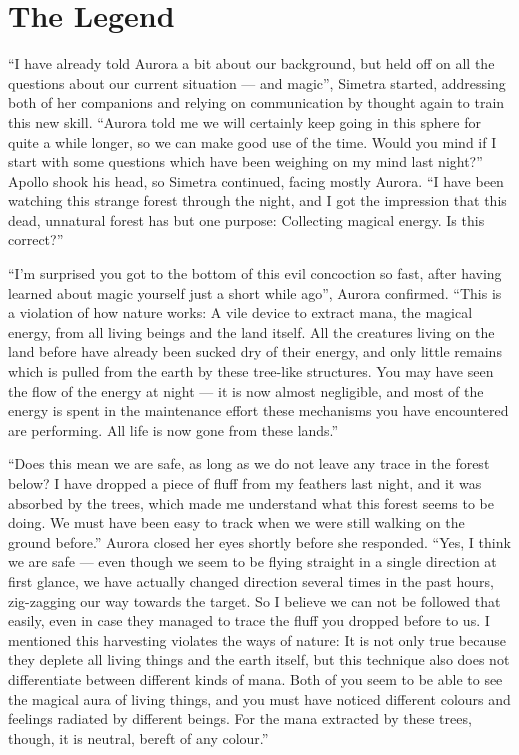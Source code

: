 \chapter{The Legend}
\label{cha:the-legend}
\enquote{I have already told Aurora a bit about our background, but held off on all the questions about our current situation --- and magic}, Simetra started, addressing both of her companions and relying on communication by thought again to train this new skill. \enquote{Aurora told me we will certainly keep going in this sphere for quite a while longer, so we can make good use of the time. Would you mind if I start with some questions which have been weighing on my mind last night?}
Apollo shook his head, so Simetra continued, facing mostly Aurora. \enquote{I have been watching this strange forest through the night, and I got the impression that this dead, unnatural forest has but one purpose: Collecting magical energy. Is this correct?}

\enquote{I'm surprised you got to the bottom of this evil concoction so fast, after having learned about magic yourself just a short while ago}, Aurora confirmed. \enquote{This is a violation of how nature works: A vile device to extract mana, the magical energy, from all living beings and the land itself. All the creatures living on the land before have already been sucked dry of their energy, and only little remains which is pulled from the earth by these tree-like structures. You may have seen the flow of the energy at night --- it is now almost negligible, and most of the energy is spent in the maintenance effort these mechanisms you have encountered are performing. All life is now gone from these lands.}

\enquote{Does this mean we are safe, as long as we do not leave any trace in the forest below? I have dropped a piece of fluff from my feathers last night, and it was absorbed by the trees, which made me understand what this forest seems to be doing. We must have been easy to track when we were still walking on the ground before.}
Aurora closed her eyes shortly before she responded. \enquote{Yes, I think we are safe --- even though we seem to be flying straight in a single direction at first glance, we have actually changed direction several times in the past hours, zig-zagging our way towards the target. So I believe we can not be followed that easily, even in case they managed to trace the fluff you dropped before to us. I mentioned this harvesting violates the ways of nature: It is not only true because they deplete all living things and the earth itself, but this technique also does not differentiate between different kinds of mana. Both of you seem to be able to see the magical aura of living things, and you must have noticed different colours and feelings radiated by different beings. For the mana extracted by these trees, though, it is neutral, bereft of any colour.}

